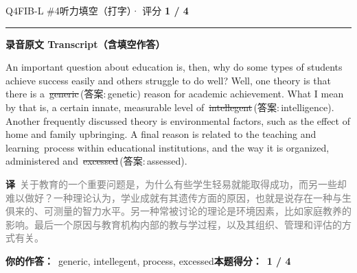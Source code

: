 \documentclass[11pt]{article}
\newcommand{\ptesub}[1]{%
  \par\needspace{2\baselineskip}\smallskip
  {\color{cAccent}\rule[-0.2ex]{3pt}{1.05em}}\hspace{6pt}%
  {\bfseries\color{cHead}#1}\par\nopagebreak\smallskip}
\newcommand{\zh}[1]{{\footnotesize\textcolor{cNote}{\textbf{译}}\ \textcolor{gray}{#1}}}
\newcommand{\rok}[1]{{\color{cFix}\ding{51}\,#1}}                 %
\newcommand{\rno}[2]{{\color{cWrong}\ding{55}\,\sout{#1}}\,{\footnotesize\color{cFix}(答案:\,#2)}}  %
\begin{document}
\begin{qblock}{Q4\quad FIB-L \#4}{听力填空（打字）· 评分 \textcolor{cAccent}{\bfseries 1 / 4}}
\ptesub{录音原文 Transcript（含填空作答）}
\begin{promptbox}
An important question about education is, then, why do some types of students achieve success easily and others struggle to do well? Well, one theory is that there is a \rno{generic}{genetic} reason for academic achievement. What I mean by that is, a certain innate, measurable level of \rno{intellegent}{intelligence}. Another frequently discussed theory is environmental factors, such as the effect of home and family upbringing. A final reason is related to the teaching and learning \rok{process} within educational institutions, and the way it is organized, administered and \rno{excessed}{assessed}.
\end{promptbox}
\zh{关于教育的一个重要问题是，为什么有些学生轻易就能取得成功，而另一些却难以做好？一种理论认为，学业成就有其遗传方面的原因，也就是说存在一种与生俱来的、可测量的智力水平。另一种常被讨论的理论是环境因素，比如家庭教养的影响。最后一个原因与教育机构内部的教与学过程，以及其组织、管理和评估的方式有关。}
\par\smallskip
\textbf{你的作答：}\ {\color{cWrong}generic, intellegent}, process, {\color{cWrong}excessed}\qquad\textbf{本题得分：}\ {\color{cAccent}\bfseries 1 / 4}
\end{qblock}
\end{document}
